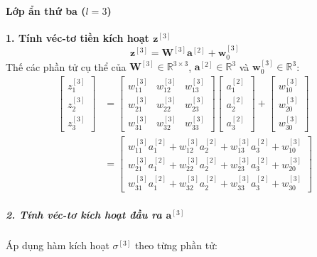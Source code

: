 \paragraph{Lớp ẩn thứ ba ($l = 3$)\\} 
\textbf{1. Tính véc-tơ tiền kích hoạt $\mathbf{z}^{[3]}$}
\begin{equation}
    \mathbf{z}^{[3]} = \mathbf{W}^{[3]} \mathbf{a}^{[2]} + \mathbf{w}_0^{[3]}
\end{equation}
Thế các phần tử cụ thể của $\mathbf{W}^{[3]} \in \mathbb{R}^{3 \times 3}$, $\mathbf{a}^{[2]} \in \mathbb{R}^3$ và $\mathbf{w}_0^{[3]} \in \mathbb{R}^3$:
\begin{align}
    \begin{bmatrix} z_1^{[3]} \\ z_2^{[3]} \\ z_3^{[3]} \end{bmatrix} 
    &= \begin{bmatrix} 
        w_{11}^{[3]} & w_{12}^{[3]} & w_{13}^{[3]} \\ 
        w_{21}^{[3]} & w_{22}^{[3]} & w_{23}^{[3]} \\ 
        w_{31}^{[3]} & w_{32}^{[3]} & w_{33}^{[3]} 
    \end{bmatrix}
    \begin{bmatrix} a_1^{[2]} \\ a_2^{[2]} \\ a_3^{[2]} \end{bmatrix} 
    + \begin{bmatrix} w_{10}^{[3]} \\ w_{20}^{[3]} \\ w_{30}^{[3]} \end{bmatrix} \nonumber \\
    &= \begin{bmatrix}
        w_{11}^{[3]} a_1^{[2]} + w_{12}^{[3]} a_2^{[2]} + w_{13}^{[3]} a_3^{[2]} + w_{10}^{[3]} \\
        w_{21}^{[3]} a_1^{[2]} + w_{22}^{[3]} a_2^{[2]} + w_{23}^{[3]} a_3^{[2]} + w_{20}^{[3]} \\
        w_{31}^{[3]} a_1^{[2]} + w_{32}^{[3]} a_2^{[2]} + w_{33}^{[3]} a_3^{[2]} + w_{30}^{[3]} 
    \end{bmatrix}
\end{align}
\subparagraph{2. Tính véc-tơ kích hoạt đầu ra $\mathbf{a}^{[3]}$\\}
Áp dụng hàm kích hoạt $\sigma^{[3]}$ theo từng phần tử:
